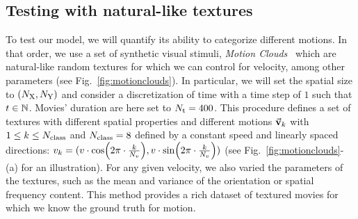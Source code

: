 \documentclass[default]{sn-jnl}%
\theoremstyle{thmstyleone}%
\theoremstyle{thmstyletwo}%
\theoremstyle{thmstylethree}%
\newcommand{\seeFig}[1]{see Fig.~\ref{fig:#1}}%
\begin{document}
\subsection{Testing with natural-like textures}
To test our model, we will quantify its ability to categorize different motions. In that order, we use a set of synthetic visual stimuli, \textit{Motion Clouds}~\citep{leon_motion_2012} which are natural-like random textures for which we can control for velocity, among other parameters (\seeFig{motionclouds}). In particular, we will set the spatial size to $(N_\text{X}, N_\text{Y})$ and consider a discretization of time with a time step of $1$ such that $t \in \mathbb{N}$. Movies' duration are here set to $N_\text{t}=400$.
This procedure defines a set of textures with different spatial properties and different motions $\va{v}_k$ with  $1 \le k \le N_\text{class}$ and $N_\text{class}=8$ defined by a constant speed and linearly spaced directions:
$
v_k = 
  ( 
    v \cdot \cos(2\pi\cdot \frac{k}{N_v}),
    v \cdot \sin(2\pi\cdot \frac{k}{N_v})
  )
$ (\seeFig{motionclouds}-(a) for an illustration).
For any given velocity, we also varied the parameters of the textures, such as the mean and variance of the orientation or spatial frequency content. This method provides a rich dataset of textured movies for which we know the ground truth for motion.
%
\end{document}
